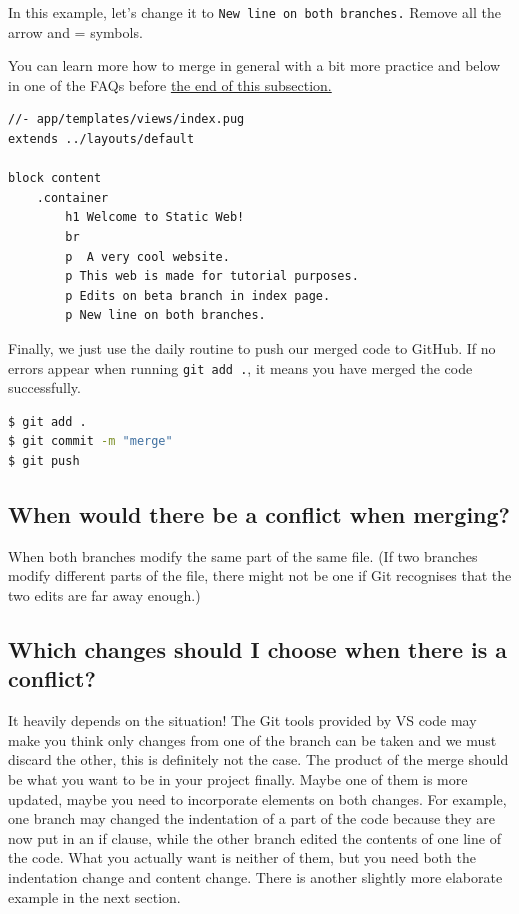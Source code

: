 In this example, let's change it to \texttt{New line on both branches.} Remove all the arrow and = symbols.

You can learn more how to merge in general with a bit more practice and below in one of the FAQs before \hyperref[sec:mergefaq]{the end of this subsection.}
\vspace{6mm}

\begin{lstlisting}[language=pug]
//- app/templates/views/index.pug
extends ../layouts/default

block content
	.container
		h1 Welcome to Static Web!
		br
		p  A very cool website.
		p This web is made for tutorial purposes.
		p Edits on beta branch in index page.
		p New line on both branches.
\end{lstlisting}
\vspace{6mm}

Finally, we just use the daily routine to push our merged code to GitHub. If no errors appear when running \texttt{git add .}, it means you have merged the code successfully.
\vspace{6mm}

\begin{lstlisting}[language=bash]
$ git add .
$ git commit -m "merge"
$ git push
\end{lstlisting}

\subsection*{When would there be a conflict when merging?}

When both branches modify the same part of the same file. (If two branches modify different parts of the file, there might not be one if Git recognises that the two edits are far away enough.)

\subsection*{Which changes should I choose when there is a conflict?}
\label{sec:mergefaq}
It heavily depends on the situation! The Git tools provided by VS code may make you think only changes from one of the branch can be taken and we must discard the other, this is definitely not the case. The product of the merge should be what you want to be in your project finally. Maybe one of them is more updated, maybe you need to incorporate elements on both changes. For example, one branch may changed the indentation of a part of the code because they are now put in an if clause, while the other branch edited the contents of one line of the code. What you actually want is neither of them, but you need both the indentation change and content change. There is another slightly more elaborate example in the next section.

